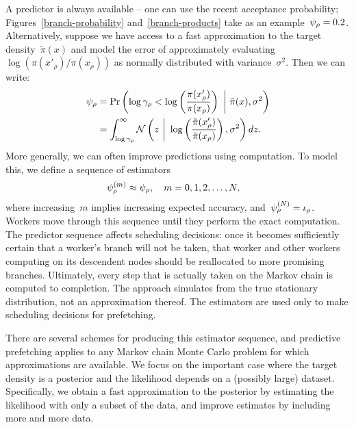 \documentclass[angelino.tex]{subfiles}
\begin{document}
A predictor is always available -- \eg one can use the recent
acceptance probability; Figures~\ref{branch-probability}
and~\ref{branch-products} take as an example~${\psi_{\rho} = 0.2}$.
Alternatively, suppose we have access to a fast approximation to the
target density~$\tilde\pi(x)$ and model the error of approximately
evaluating~$\log(\pi(x'_\rho)/\pi(x_\rho))$ as normally distributed with
variance~$\sigma^2$.  Then we can write:
%
\begin{align}
  \psi_{\rho} &= 
  \Pr\left( \log\gamma_\rho < \log\left(\frac{\pi(x'_\rho)}{\pi(x_\rho)}\right)
  ~\bigg\vert~ \tilde\pi(x), \sigma^2 \right ) \\
  &= \int_{\log\gamma_\rho}^\infty {\mathcal N}\left(z ~\bigg\vert~ 
  \log\left(\frac{\tilde\pi(x'_\rho)}{\tilde\pi(x_\rho)}\right), \sigma^2\right) dz.
  \label{eqn:estimator}
\end{align}
%
More generally, we can often improve predictions using computation.
To model this, we define a sequence of estimators
%
\begin{align}
  \psi_{\rho}^{(m)} &\approx \psi_{\rho}, \quad m=0,1,2,\dots,N,
  \label{eqn:estimator-sequence}
\end{align}
%
where increasing~$m$ implies increasing expected accuracy,
and~$\psi_{\rho}^{(N)} = \iota_{\rho}$.
%
Workers move through this sequence until they perform the exact computation.
The predictor sequence affects scheduling decisions:
once it becomes sufficiently certain that a worker's branch will not be taken,
that worker and other workers computing on its descendent nodes
should be reallocated to more promising branches.
%
Ultimately, every step that is actually taken on the Markov chain is computed to completion.  
%
The approach simulates from the true stationary distribution, not an approximation thereof. 
%
The estimators are used only to make scheduling decisions for prefetching.

There are several schemes for producing this estimator sequence,
and predictive prefetching applies to any Markov chain Monte Carlo problem
for which approximations are available.
%
We focus on the important case where the target density is a posterior and
the likelihood depends on a (possibly large) dataset.
Specifically, we obtain a fast approximation to the posterior
by estimating the likelihood with only a subset of the data,
and improve estimates by including more and more data.
\end{document}
